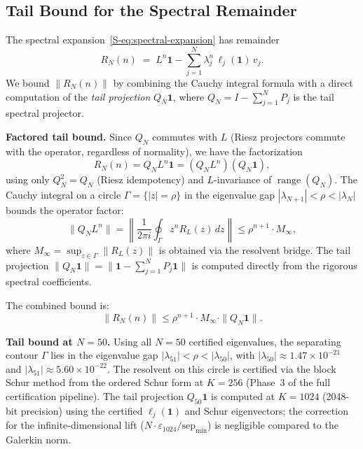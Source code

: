 \documentclass[11pt]{article}
\begin{document}
\clearpage
\subsection*{Tail Bound for the Spectral Remainder}

The spectral expansion~\eqref{S-eq:spectral-expansion} has remainder
\[
R_N(n) \;=\; L^n \mathbf{1} - \sum_{j=1}^{N} \lambda_j^n \, \ell_j(\mathbf{1}) \, v_j.
\]
We bound $\|R_N(n)\|$ by combining the Cauchy integral formula with a
direct computation of the \emph{tail projection} $Q_N \mathbf{1}$, where
$Q_N = I - \sum_{j=1}^N P_j$ is the tail spectral projector.

\medskip\noindent
\textbf{Factored tail bound.}
Since $Q_N$ commutes with $L$ (Riesz projectors commute with the operator,
regardless of normality), we have the factorization
\[
R_N(n) = Q_N L^n \mathbf{1} = (Q_N L^n)(Q_N \mathbf{1}),
\]
using only $Q_N^2 = Q_N$ (Riesz idempotency) and $L$-invariance of $\operatorname{range}(Q_N)$.
The Cauchy integral on a circle $\Gamma = \{|z| = \rho\}$ in the eigenvalue gap
$|\lambda_{N+1}| < \rho < |\lambda_N|$ bounds the operator factor:
\[
\|Q_N L^n\| = \left\|\frac{1}{2\pi i} \oint_\Gamma z^n R_L(z)\,dz\right\|
\leq \rho^{n+1} \cdot M_\infty,
\]
where $M_\infty = \sup_{z\in\Gamma} \|R_L(z)\|$ is obtained via the resolvent bridge.
The tail projection $\|Q_N \mathbf{1}\| = \|\mathbf{1} - \sum_{j=1}^N P_j \mathbf{1}\|$
is computed directly from the rigorous spectral coefficients.

The combined bound is:
\[
\boxed{\|R_N(n)\| \leq \rho^{n+1} \cdot M_\infty \cdot \|Q_N \mathbf{1}\|.}
\]

\medskip\noindent
\textbf{Tail bound at $N = 50$.}
Using all $N = 50$ certified eigenvalues, the separating contour $\Gamma$ lies
in the eigenvalue gap $|\lambda_{51}| < \rho < |\lambda_{50}|$,
with $|\lambda_{50}| \approx 1.47 \times 10^{-21}$ and
$|\lambda_{51}| \approx 5.60 \times 10^{-22}$.
The resolvent on this circle is certified via the block Schur
method from the ordered Schur form at $K = 256$
(Phase~3 of the full certification pipeline).
The tail projection $Q_{50}\mathbf{1}$ is computed at $K = 1024$
(2048-bit precision) using the certified $\ell_j(\mathbf{1})$ and Schur eigenvectors;
the correction for the infinite-dimensional lift ($N \cdot \varepsilon_{1024} / \mathrm{sep}_{\min}$)
is negligible compared to the Galerkin norm.
\end{document}
